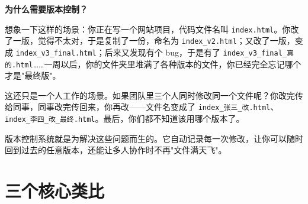 \documentclass[12pt,a4paper,openany]{ctexbook}
\begin{document}
\begin{warnbox}
\textbf{为什么需要版本控制？}

想象一下这样的场景：你正在写一个网站项目，代码文件名叫 \texttt{index.html}。你改了一版，觉得不太对，于是复制了一份，命名为 \texttt{index\_v2.html}；又改了一版，变成 \texttt{index\_v3\_final.html}；后来又发现有个 bug，于是有了 \texttt{index\_v3\_final\_真的.html}……一周以后，你的文件夹里堆满了各种版本的文件，你已经完全忘记哪个才是"最终版"。

这还只是一个人工作的场景。如果团队里三个人同时修改同一个文件呢？你改完传给同事，同事改完传回来，你再改——文件名变成了 \texttt{index\_张三\_改.html}、\texttt{index\_李四\_改\_最终.html}。最后，你们都不知道该用哪个版本了。

版本控制系统就是为解决这些问题而生的。它自动记录每一次修改，让你可以随时回到过去的任意版本，还能让多人协作时不再"文件满天飞"。
\end{warnbox}

\section{三个核心类比}
\end{document}
